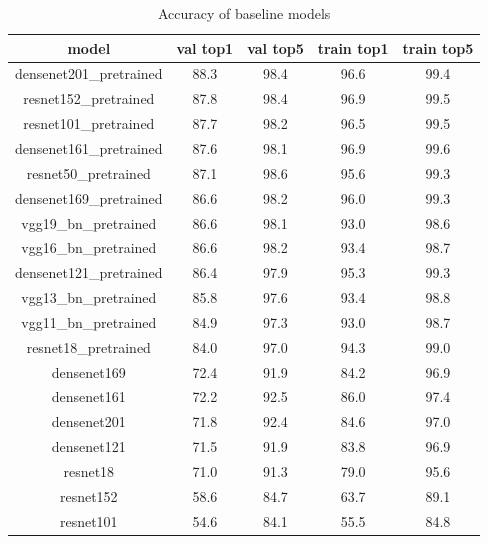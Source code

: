 \begin{table}
  \centering
  \caption{Accuracy of baseline models}
  \label{tabel:val_acc}
  \begin{tabular}{ccccc}
    \hline
    \toprule
    model                   & val top1 & val top5 & train top1 & train top5 \\
    \midrule  %

    densenet201\_pretrained & 88.3     & 98.4     & 96.6       & 99.4       \\
    resnet152\_pretrained   & 87.8     & 98.4     & 96.9       & 99.5       \\
    resnet101\_pretrained   & 87.7     & 98.2     & 96.5       & 99.5       \\
    densenet161\_pretrained & 87.6     & 98.1     & 96.9       & 99.6       \\
    resnet50\_pretrained    & 87.1     & 98.6     & 95.6       & 99.3       \\
    densenet169\_pretrained & 86.6     & 98.2     & 96.0       & 99.3       \\
    vgg19\_bn\_pretrained   & 86.6     & 98.1     & 93.0       & 98.6       \\
    vgg16\_bn\_pretrained   & 86.6     & 98.2     & 93.4       & 98.7       \\
    densenet121\_pretrained & 86.4     & 97.9     & 95.3       & 99.3       \\
    vgg13\_bn\_pretrained   & 85.8     & 97.6     & 93.4       & 98.8       \\
    vgg11\_bn\_pretrained   & 84.9     & 97.3     & 93.0       & 98.7       \\
    resnet18\_pretrained    & 84.0     & 97.0     & 94.3       & 99.0       \\
    densenet169             & 72.4     & 91.9     & 84.2       & 96.9       \\
    densenet161             & 72.2     & 92.5     & 86.0       & 97.4       \\
    densenet201             & 71.8     & 92.4     & 84.6       & 97.0       \\
    densenet121             & 71.5     & 91.9     & 83.8       & 96.9       \\
    resnet18                & 71.0     & 91.3     & 79.0       & 95.6       \\
    resnet152               & 58.6     & 84.7     & 63.7       & 89.1       \\
    resnet101               & 54.6     & 84.1     & 55.5       & 84.8       \\

\end{tabular}
\end{table}
